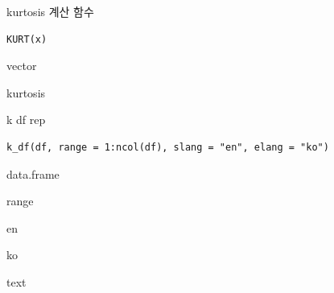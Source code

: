 \documentclass[a4paper]{book}
\begin{document}
%
\begin{Description}
kurtosis 계산 함수
\end{Description}
%
\begin{Usage}
\begin{verbatim}
KURT(x)
\end{verbatim}
\end{Usage}
%
\begin{Arguments}
\begin{ldescription}
\item[\code{x}] vector
\end{ldescription}
\end{Arguments}
%
\begin{Value}
kurtosis
\end{Value}

%
\begin{Description}
k df rep
\end{Description}
%
\begin{Usage}
\begin{verbatim}
k_df(df, range = 1:ncol(df), slang = "en", elang = "ko")
\end{verbatim}
\end{Usage}
%
\begin{Arguments}
\begin{ldescription}
\item[\code{df}] data.frame

\item[\code{range}] range

\item[\code{slang}] en

\item[\code{elang}] ko
\end{ldescription}
\end{Arguments}
%
\begin{Value}
text
\end{Value}
%
\end{document}
